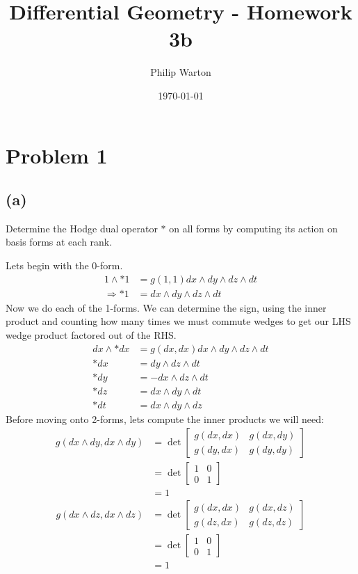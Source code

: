 \documentclass{article}
\theoremstyle{definition}
\begin{document}
\title{Differential Geometry - Homework 3b}
\author{Philip Warton}
\date{\today}
\maketitle
\section*{Problem 1}
\subsection*{(a)}
\begin{mdframed}
    Determine the Hodge dual operator $*$ on all forms by computing its action on basis
    forms at each rank.
\end{mdframed}
Lets begin with the 0-form.
\begin{align*}
    1 \wedge * 1 &= g(1,1) dx \wedge dy \wedge dz \wedge dt \\
    \Longrightarrow *1 & = dx \wedge dy \wedge dz \wedge dt
\end{align*}
Now we do each of the 1-forms. We can determine the sign, using the inner product and counting
how many times we must commute wedges to get our LHS wedge product factored out of the RHS.
\begin{align*}
    dx \wedge * dx & = g(dx,dx) dx \wedge dy \wedge dz \wedge dt \\
    *dx & = dy \wedge dz \wedge dt \\
    *dy & = -dx \wedge dz \wedge dt \\
    *dz & = dx \wedge dy \wedge dt \\
    *dt & = dx \wedge dy \wedge dz
\end{align*}
Before moving onto 2-forms, lets compute the inner products we will need:
\begin{align*} 
    g(dx \wedge dy, dx \wedge dy) & = \det\begin{bmatrix}
        g(dx, dx) & g(dx, dy) \\
        g(dy, dx) & g(dy, dy)
    \end{bmatrix}\\
    &= \det \begin{bmatrix}
        1 & 0 \\
        0 & 1
    \end{bmatrix}\\
    &= 1
\end{align*}
\begin{align*}
    g(dx \wedge dz, dx \wedge dz) & = \det \begin{bmatrix}
        g(dx, dx) & g(dx, dz) \\
        g(dz, dx) & g(dz, dz)
    \end{bmatrix} \\
    &= \det \begin{bmatrix}
        1 & 0\\0 & 1
    \end{bmatrix}\\
    &= 1
\end{align*}
\end{document}
